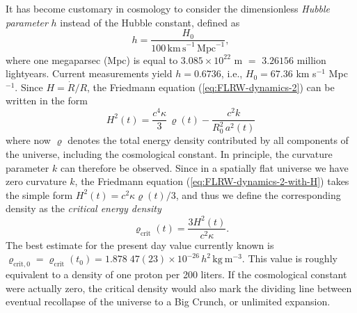 It has become customary in cosmology to consider the dimensionless \emph{Hubble parameter} $h$ instead of the Hubble constant, defined as
\begin{equation}
	h 
	= \frac{H_0}{100 \, \mathrm{km \, s}^{-1} \, \mathrm{Mpc}^{-1}}
	,
\end{equation}
where one megaparsec (Mpc) is equal to $3.085 \times 10^{22}$ m $=$ $3.26156$ million lightyears.
Current measurements yield $h = 0.6736$, i.e., $H_0 = 67.36$ km s$^{-1}$ Mpc$^{-1}$. \cite[Eq. (14)]{Planck-Collaboration-2020}
Since $H = \dot{R}/R$, the Friedmann equation (\ref{eq:FLRW-dynamics-2}) can be written in the form
\begin{equation}
	H^2 (t)
	= \frac{c^4 \kappa}{3} \, \varrho(t) - \frac{c^2 k}{R_0^2 \, a^2(t)}
	\label{eq:FLRW-dynamics-2-with-H}
\end{equation}
where now $\varrho$ denotes the total energy density contributed by all components of the universe, including the cosmological constant.
In principle, the curvature parameter $k$ can therefore be observed. Since in a spatially flat universe we have zero curvature $k$, the Friedmann equation (\ref{eq:FLRW-dynamics-2-with-H}) takes the simple form $H^2(t) = c^2 \kappa \varrho(t)/3$, and thus we define the corresponding density as the \emph{critical energy density}
\begin{equation}
	\varrho_{\mathrm{crit}}(t)
	=
	\frac{3H^{2}(t)}{c^2 \kappa}
	.
	\label{eq:FLRW-rho-crit}
\end{equation}
The best estimate for the present day value currently known is
$ %
	\varrho_{\mathrm{crit}, 0}
	= \varrho_{\mathrm{crit}}(t_0)
	=
	1.878\;47(23) \times 10^{-26}\,h^{2}\,\mathrm{kg \ m^{-3}}
	.
$ %
\cite[Eqs. (1.4), (1.7)]{Dodelson-Schmidt-2025}
This value is roughly equivalent to a density of one proton per 200 liters. \cite[57]{Ryden-2017}
If the cosmological constant were actually zero, the critical density would also mark the dividing line between eventual recollapse of the universe to a Big Crunch, or unlimited expansion.
